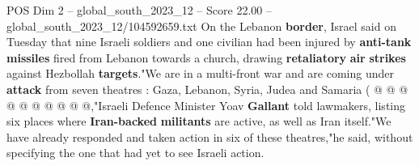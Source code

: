 \begin{textsample}{POS Dim 2 – global\_south\_2023\_12 – Score 22.00 – global\_south\_2023\_12/104592659.txt}
On the Lebanon \textbf{border}, Israel said on Tuesday that nine Israeli soldiers and one civilian had been injured by \textbf{anti-tank} \textbf{missiles} fired from Lebanon towards a church, drawing \textbf{retaliatory} \textbf{air} \textbf{strikes} against Hezbollah \textbf{targets}."We are in a multi-front war and are coming under \textbf{attack} from seven theatres : Gaza, Lebanon, Syria, Judea and Samaria ( @ @ @ @ @ @ @ @ @ @,"Israeli Defence Minister Yoav \textbf{Gallant} told lawmakers, listing six places where \textbf{Iran-backed} \textbf{militants} are active, as well as Iran itself."We have already responded and taken action in six of these theatres,"he said, without specifying the one that had yet to see Israeli action.

\end{textsample}
